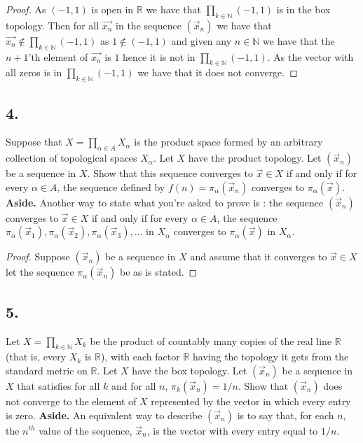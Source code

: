 \documentclass{amsart}
\theoremstyle{plain}
\theoremstyle{definition}
\theoremstyle{remark}
\begin{document}
\begin{proof}

    As $(-1,1)$ is open in $\mathbb{R}$ we have that $\prod_{k\in \mathbb{N}}(-1,1)$ is in the box topology. Then for all $\vec{x_n}$ in the sequence $(\vec x_n)$ we have that $\vec{x_n}\not \in \prod_{k\in \mathbb{N}}(-1,1)$ as $1\not \in (-1,1)$ and given any $n\in \mathbb{N}$ we have that the $n+1$'th element of $\vec{x_n}$ is $1$ hence it is not in $\prod_{k\in \mathbb{N}}(-1,1)$. As the vector with all zeros is in $\prod_{k\in \mathbb{N}}(-1,1)$ we have that it does not converge.

    
\end{proof}



\vspace{.15in}

\noindent
\subsection*{4.} Suppose that  $X = \prod _{\alpha \in A} X_{\alpha}$ is the product space formed by an arbitrary collection of topological spaces $X_{\alpha}$. Let $X$ have the product topology. Let $(\vec{x}_n)$ be a sequence in $X$. Show that this sequence converges to $\vec{x} \in X$ if and only if for every $\alpha \in A$, the sequence defined by $f(n) = \pi _{\alpha} (\vec{x}_n)$ converges to $ \pi _{\alpha} (\vec{x})$. {\bfseries Aside.} Another way to state what you're asked to prove is : the sequence $(\vec{x}_n)$ converges to $\vec{x} \in X$ if and only if for every $\alpha \in A$, the sequence $\pi _{\alpha} (\vec{x}_1) , \pi _{\alpha} (\vec{x}_2), \pi _{\alpha} (\vec{x}_3) , . . . $ in $X_{\alpha}$ converges to $ \pi _{\alpha} (\vec{x})$ in $X_{\alpha}$.


\begin{proof}
    Suppose $(\vec{x}_n)$ be a sequence in $X$ and assume that it converges to $\vec{x}\in X$ let the sequence $\pi_\alpha(\vec{x}_n)$ be as is stated. 
\end{proof}


\vspace{.15in}

\noindent
\subsection*{5.} Let $X =\prod _{k\in \mathbb N} X_k$ be the product of countably many copies of the real line $\mathbb R$  (that is, every $X_k$ is $\mathbb R$), with each factor $\mathbb R$ having the topology it gets from the standard metric on $\mathbb R$. Let $X$ have the box topology. Let $(\vec{x}_n)$ be a sequence in $X$ that satisfies for all $k$ and for all $n$, $\pi_k  (\vec{x}_n) = 1/n$. Show that $(\vec{x}_n)$ does not converge to the element of $X$ represented by the vector in which every entry is zero. {\bfseries Aside.} An equivalent way to describe $(\vec{x}_n)$ is to say that, for each $n$, the $n^{th}$ value of the sequence, $\vec{x}_n$, is the vector with every entry equal to $1/n$.
\end{document}
